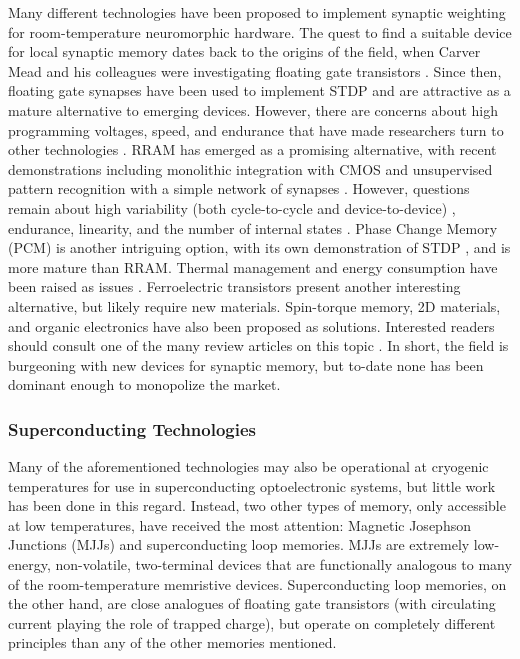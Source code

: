 \documentclass{article}
\begin{document}
Many different technologies have been proposed to implement synaptic weighting for room-temperature neuromorphic hardware. The quest to find a suitable device for local synaptic memory dates back to the origins of the field, when Carver Mead and his colleagues were investigating floating gate transistors \cite{diorio1998floating}. Since then, floating gate synapses have been used to implement STDP \cite{ramakrishnan2011floating} and are attractive as a mature alternative to emerging devices. However, there are concerns about high programming voltages, speed, and endurance that have made researchers turn to other technologies \cite{zahoor2020resistive}. RRAM has emerged as a promising alternative, with recent demonstrations including monolithic integration with CMOS \cite{yin2019monolithically} and unsupervised pattern recognition with a simple network of synapses \cite{ielmini2018brain}. However, questions remain about high variability (both cycle-to-cycle and device-to-device) \cite{dalgaty2019hybrid}, endurance, linearity, and the number of internal states \cite{zahoor2020resistive}. Phase Change Memory (PCM) is another intriguing option, with its own demonstration of STDP \cite{ambrogio2016unsupervised}, and is more mature than RRAM. Thermal management and energy consumption have been raised as issues \cite{upadhyay2019emerging, zahoor2020resistive}. Ferroelectric transistors present another interesting alternative, but likely require new materials. Spin-torque memory, 2D materials, and organic electronics have also been proposed as solutions. Interested readers should consult one of the many review articles on this topic \cite{kim2018recent, upadhyay2019emerging, zhang2020brain}. In short, the field is burgeoning with new devices for synaptic memory, but to-date none has been dominant enough to monopolize the market.

\subsubsection{Superconducting Technologies}
Many of the aforementioned technologies may also be operational at cryogenic temperatures for use in superconducting optoelectronic systems, but little work has been done in this regard. Instead, two other types of memory, only accessible at low temperatures, have received the most attention: Magnetic Josephson Junctions (MJJs) and superconducting loop memories. MJJs are extremely low-energy, non-volatile, two-terminal devices that are functionally analogous to many of the room-temperature memristive devices. Superconducting loop memories, on the other hand, are close analogues of floating gate transistors (with circulating current playing the role of trapped charge), but operate on completely different principles than any of the other memories mentioned.
\end{document}
